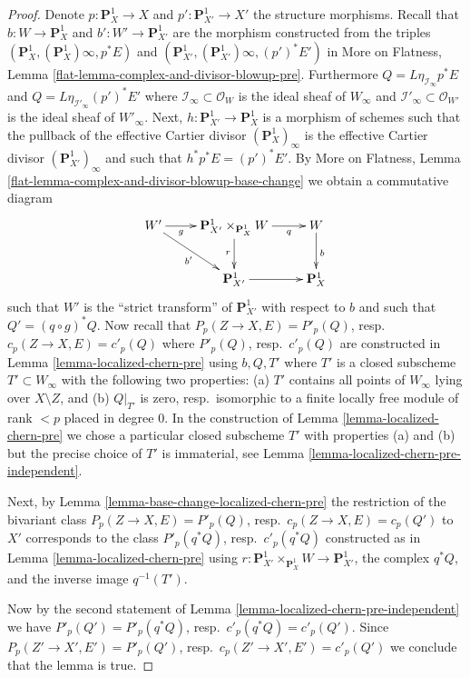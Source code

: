 \documentclass[10pt,a4paper]{amsart}
\theoremstyle{plain}
\theoremstyle{definition}
\theoremstyle{remark}
\numberwithin{equation}{subsection}
\begin{document}
\begin{proof}
Denote $p : \mathbf{P}^1_X \to X$ and $p' : \mathbf{P}^1_{X'} \to X'$
the structure morphisms.
Recall that $b : W \to \mathbf{P}^1_X$ and $b' : W' \to \mathbf{P}^1_{X'}$
are the morphism constructed from the triples
$(\mathbf{P}^1_X, (\mathbf{P}^1_X)\infty, p^*E)$ and
$(\mathbf{P}^1_{X'}, (\mathbf{P}^1_{X'})\infty, (p')^*E')$
in More on Flatness, Lemma \ref{flat-lemma-complex-and-divisor-blowup-pre}.
Furthermore $Q = L\eta_{\mathcal{I}_\infty}p^*E$ and
$Q = L\eta_{\mathcal{I}'_\infty}(p')^*E'$
where
$\mathcal{I}_\infty \subset \mathcal{O}_W$ is the
ideal sheaf of $W_\infty$ and
$\mathcal{I}'_\infty \subset \mathcal{O}_{W'}$ is the
ideal sheaf of $W'_\infty$.
Next, $h : \mathbf{P}^1_{X'} \to \mathbf{P}^1_X$ is a morphism of
schemes such that the pullback of the effective Cartier divisor
$(\mathbf{P}^1_X)_\infty$ is the effective Cartier divisor
$(\mathbf{P}^1_{X'})_\infty$ and such that $h^*p^*E = (p')^*E'$.
By More on Flatness, Lemma
\ref{flat-lemma-complex-and-divisor-blowup-base-change}
we obtain a commutative diagram
$$
\xymatrix{
W' \ar[rd]_{b'} \ar[r]_-g &
\mathbf{P}^1_{X'} \times_{\mathbf{P}^1_X} W \ar[d]_r \ar[r]_-q &
W \ar[d]^b \\
&
\mathbf{P}^1_{X'} \ar[r] &
\mathbf{P}^1_X
}
$$
such that $W'$ is the ``strict transform'' of $\mathbf{P}^1_{X'}$
with respect to $b$ and such that $Q' = (q \circ g)^*Q$.
Now recall that $P_p(Z \to X, E) = P'_p(Q)$,
resp.\ $c_p(Z \to X, E) = c'_p(Q)$ where $P'_p(Q)$, resp.\ $c'_p(Q)$
are constructed in Lemma \ref{lemma-localized-chern-pre}
using $b, Q, T'$ where $T'$ is a closed subscheme $T' \subset W_\infty$
with the following two properties:
(a) $T'$ contains all points of $W_\infty$ lying over $X \setminus Z$,
and (b) $Q|_{T'}$ is zero, resp.\ isomorphic to a finite locally free
module of rank $< p$ placed in degree $0$.
In the construction of Lemma \ref{lemma-localized-chern-pre}
we chose a particular closed subscheme $T'$ with properties (a) and (b)
but the precise choice of $T'$ is immaterial, see
Lemma \ref{lemma-localized-chern-pre-independent}.

\medskip\noindent
Next, by Lemma \ref{lemma-base-change-localized-chern-pre}
the restriction of the bivariant class $P_p(Z \to X, E) = P'_p(Q)$,
resp.\ $c_p(Z \to X, E) = c_p(Q')$
to $X'$ corresponds to the class $P'_p(q^*Q)$, resp.\ $c'_p(q^*Q)$
constructed as in Lemma \ref{lemma-localized-chern-pre} using
$r : \mathbf{P}^1_{X'} \times_{\mathbf{P}^1_X} W \to \mathbf{P}^1_{X'}$,
the complex $q^*Q$, and the inverse image $q^{-1}(T')$.

\medskip\noindent
Now by the second statement of
Lemma \ref{lemma-localized-chern-pre-independent}
we have $P'_p(Q') = P'_p(q^*Q)$, resp.\ $c'_p(q^*Q) = c'_p(Q')$.
Since $P_p(Z' \to X', E') = P'_p(Q')$, resp.\ $c_p(Z' \to X', E') = c'_p(Q')$
we conclude that the lemma is true.
\end{proof}
\end{document}
